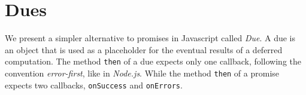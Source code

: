 


\section{Dues} \label{section:due}

We present a simpler alternative to promises in Javascript called \textit{Due}.
A due is an object that is used as a placeholder for the eventual results of a deferred computation.
The method \texttt{then} of a due expects only one callback, following the convention \textit{error-first}, like in \textit{Node.js}.%
While the method \texttt{then} of a promise expects two callbacks, \texttt{onSuccess} and \texttt{onErrors}. 

